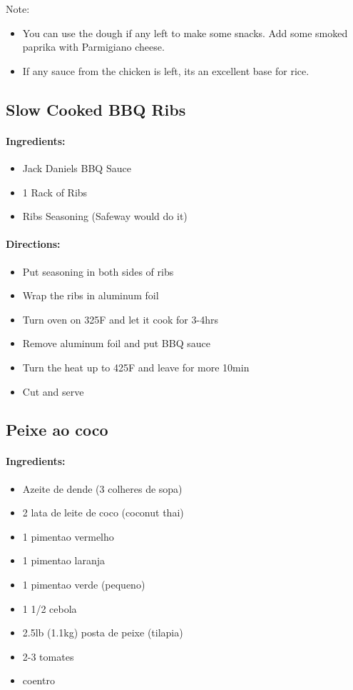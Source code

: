 \documentclass{article}
\begin{document}
Note:

\begin{itemize}
\item You can use the dough if any left to make some snacks. Add some smoked paprika with Parmigiano cheese.
\item If any sauce from the chicken is left, its an excellent base for rice.
\end{itemize}

\subsection{Slow Cooked BBQ Ribs}

\paragraph{Ingredients:}

\begin{itemize}
\item Jack Daniels BBQ Sauce 
\item 1 Rack of Ribs 
\item Ribs Seasoning (Safeway would do it)
\end{itemize}

\paragraph{Directions:}
\begin{itemize}
\item Put seasoning in both sides of ribs 
\item Wrap the ribs in aluminum foil 
\item Turn oven on 325F and let it cook for 3-4hrs 
\item Remove aluminum foil and put BBQ sauce 
\item Turn the heat up to 425F and leave for more 10min 
\item Cut and serve
\end{itemize}

\subsection{Peixe ao coco}

\paragraph{Ingredients:}

\begin{itemize}
	\item Azeite de dende (3 colheres de sopa)
	\item 2 lata de leite de coco (coconut thai)
	\item 1 pimentao vermelho
	\item 1 pimentao laranja
	\item 1 pimentao verde (pequeno)
	\item 1 1/2 cebola
	\item 2.5lb (1.1kg) posta de peixe (tilapia)
	\item 2-3 tomates
	\item coentro
\end{itemize}
\end{document}
